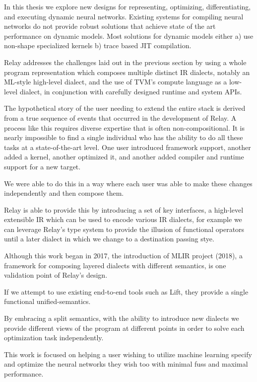 In this thesis we explore new designs for representing,
  optimizing, differentiating, and executing dynamic neural networks.
Existing systems for compiling neural networks do not provide robust
   solutions that achieve state of the art performance on dynamic models.
Most solutions for dynamic models either
  a) use non-shape specialized kernels b) trace based JIT compilation.

Relay addresses the challenges laid out in the previous section by using
  a whole program representation which composes multiple distinct IR dialects,
  notably an ML-style high-level dialect,
  and the use of TVM’s compute language as a low-level dialect,
  in conjunction with carefully designed runtime and system APIs.

The hypothetical story of the user needing to extend the entire stack is derived
  from a true sequence of events that occurred in the development of Relay.
A process like this requires diverse expertise that is often non-compositional. It is nearly impossible to find a single individual who has the ability
  to do all these tasks at a state-of-the-art level.
One user introduced framework support, another added a kernel, another optimized it, and another added compiler and runtime support for a new target.

We were able to do this in a way where each user was able to make these changes independently and then compose them.

Relay is able to provide this by introducing a set of key interfaces, a high-level extensible IR which can be used to encode various IR dialects,
  for example we can leverage Relay’s type system to provide the illusion of functional operators until a later dialect in which we change
  to a destination passing stye.

Although this work began in 2017, the introduction of MLIR project (2018), a framework for composing layered dialects with different semantics,
is one validation point of Relay’s design.

If we attempt to use existing end-to-end tools such as Lift, they provide a single functional unified-semantics.

By embracing a split semantics, with the ability to introduce new dialects we provide different views of the program at different points in order to solve each optimization task independently.

This work is focused on helping a user wishing to utilize machine learning specify and optimize
  the neural networks they wish too with minimal fuss and maximal performance.

